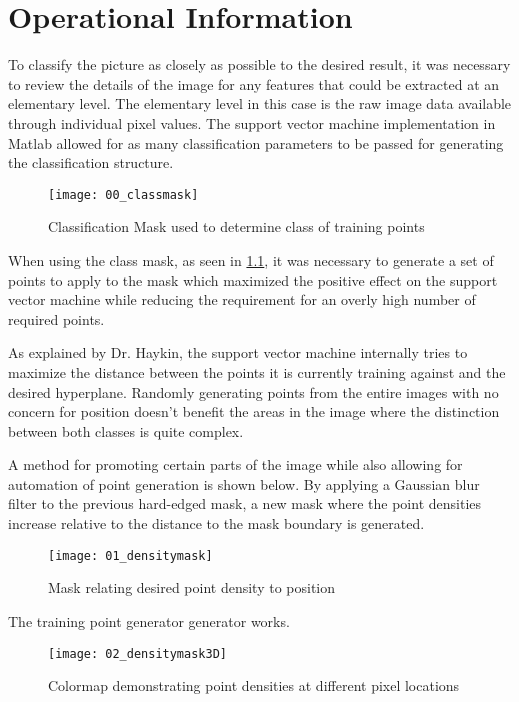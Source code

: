 \chapter{Operational Information}

To classify the picture as closely as possible to the desired result, it was necessary to review the details of the image for any features that could be extracted at an elementary level. The elementary level in this case is the raw image data available through individual pixel values. The support vector machine implementation in Matlab allowed for as many classification parameters to be passed for generating the classification structure. 

\begin{figure}[h]
    \centering
    \texttt{[image: 00\_classmask]}
    \caption{Classification Mask used to determine class of training points}
    \label{fig:00_classmask}
\end{figure}

When using the class mask, as seen in \ref{fig:00_classmask}, it was necessary to generate a set of points to apply to the mask which maximized the positive effect on the support vector machine while reducing the requirement for an overly high number of required points. 

As explained by Dr. Haykin, the support vector machine internally tries to maximize the distance between the points it is currently training against and the desired hyperplane\citep{SH_hyperplane0}. Randomly generating points from the entire images with no concern for position doesn't benefit the areas in the image where the distinction between both classes is quite complex. 

A method for promoting certain parts of the image while also allowing for automation of point generation is shown below. By applying a Gaussian blur filter to the previous hard-edged mask, a new mask where the point densities increase relative to the distance to the mask boundary is generated.

\begin{figure}[h]
    \centering
    \texttt{[image: 01\_densitymask]}
    \caption{Mask relating desired point density to position}
    \label{fig:01_densitymask}
\end{figure}

The training point generator generator works.

\begin{figure}[h]
    \centering
    \texttt{[image: 02\_densitymask3D]}
    \caption{Colormap demonstrating point densities at different pixel locations}
    \label{fig:02_densitymask3D}
\end{figure}

